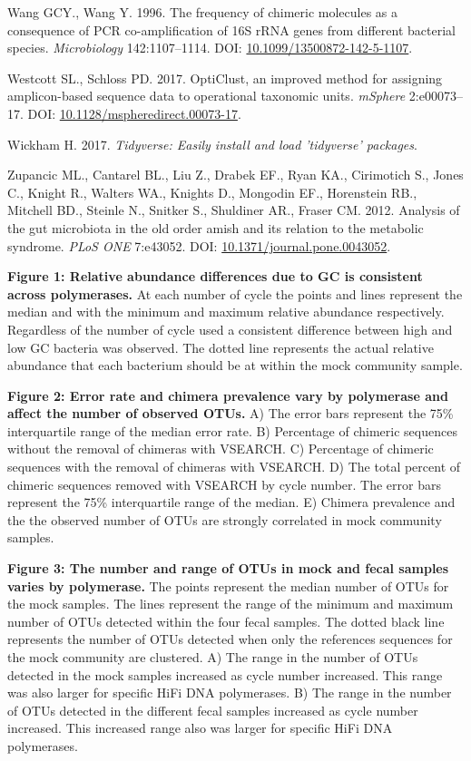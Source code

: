 \documentclass[11pt,]{article}
\begin{document}
\hypertarget{ref-Wang1996}{}
Wang GCY., Wang Y. 1996. The frequency of chimeric molecules as a
consequence of PCR co-amplification of 16S rRNA genes from different
bacterial species. \emph{Microbiology} 142:1107--1114. DOI:
\href{https://doi.org/10.1099/13500872-142-5-1107}{10.1099/13500872-142-5-1107}.

\hypertarget{ref-opticlust_Westcott_2017}{}
Westcott SL., Schloss PD. 2017. OptiClust, an improved method for
assigning amplicon-based sequence data to operational taxonomic units.
\emph{mSphere} 2:e00073--17. DOI:
\href{https://doi.org/10.1128/mspheredirect.00073-17}{10.1128/mspheredirect.00073-17}.

\hypertarget{ref-tidyverse_2017}{}
Wickham H. 2017. \emph{Tidyverse: Easily install and load 'tidyverse'
packages}.

\hypertarget{ref-Zupancic2012}{}
Zupancic ML., Cantarel BL., Liu Z., Drabek EF., Ryan KA., Cirimotich S.,
Jones C., Knight R., Walters WA., Knights D., Mongodin EF., Horenstein
RB., Mitchell BD., Steinle N., Snitker S., Shuldiner AR., Fraser CM.
2012. Analysis of the gut microbiota in the old order amish and its
relation to the metabolic syndrome. \emph{PLoS ONE} 7:e43052. DOI:
\href{https://doi.org/10.1371/journal.pone.0043052}{10.1371/journal.pone.0043052}.

\newpage

\textbf{Figure 1: Relative abundance differences due to GC is consistent
across polymerases.} At each number of cycle the points and lines
represent the median and with the minimum and maximum relative abundance
respectively. Regardless of the number of cycle used a consistent
difference between high and low GC bacteria was observed. The dotted
line represents the actual relative abundance that each bacterium should
be at within the mock community sample.

\textbf{Figure 2: Error rate and chimera prevalence vary by polymerase
and affect the number of observed OTUs.} A) The error bars represent the
75\% interquartile range of the median error rate. B) Percentage of
chimeric sequences without the removal of chimeras with VSEARCH. C)
Percentage of chimeric sequences with the removal of chimeras with
VSEARCH. D) The total percent of chimeric sequences removed with VSEARCH
by cycle number. The error bars represent the 75\% interquartile range
of the median. E) Chimera prevalence and the the observed number of OTUs
are strongly correlated in mock community samples.

\textbf{Figure 3: The number and range of OTUs in mock and fecal samples
varies by polymerase.} The points represent the median number of OTUs
for the mock samples. The lines represent the range of the minimum and
maximum number of OTUs detected within the four fecal samples. The
dotted black line represents the number of OTUs detected when only the
references sequences for the mock community are clustered. A) The range
in the number of OTUs detected in the mock samples increased as cycle
number increased. This range was also larger for specific HiFi DNA
polymerases. B) The range in the number of OTUs detected in the
different fecal samples increased as cycle number increased. This
increased range also was larger for specific HiFi DNA polymerases.
\end{document}
